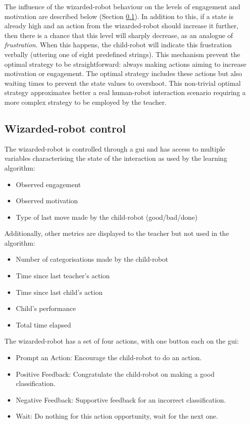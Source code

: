 The influence of the wizarded-robot behaviour on the levels of engagement and motivation are described below (Section \ref{ssec:woz_wizarded_robot}). In addition to this, if a state is already high and an action from the wizarded-robot should increase it further, then there is a chance that this level will sharply decrease, as an analogue of \textit{frustration}. When this happens, the child-robot will indicate this frustration verbally (uttering one of eight predefined strings). This mechanism prevent the optimal strategy to be straightforward: always making actions aiming to increase motivation or engagement. The optimal strategy includes these actions but also waiting times to prevent the state values to overshoot. This non-trivial optimal strategy approximates better a real human-robot interaction scenario requiring a more complex strategy to be employed by the teacher.

\subsection{Wizarded-robot control}
\label{ssec:woz_wizarded_robot}
The wizarded-robot is controlled through a \gls{gui} and has access to multiple variables characterising the state of the interaction as used by the learning algorithm:
\begin{itemize}
	\item Observed engagement
	\item Observed motivation
	\item Type of last move made by the child-robot (good/bad/done)
\end{itemize}
Additionally, other metrics are displayed to the teacher but not used in the algorithm:
\begin{itemize}
	\item Number of categorisations made by the child-robot
	\item Time since last teacher's action
	\item Time since last child's action
	\item Child's performance
	\item Total time elapsed
\end{itemize}


The wizarded-robot has a set of four actions, with one button each on the \gls{gui}: 
\begin{itemize}
	\item Prompt an Action: Encourage the child-robot to do an action.
	\item Positive Feedback: Congratulate the child-robot on making a good classification.
	\item Negative Feedback: Supportive feedback for an incorrect classification.
	\item Wait: Do nothing for this action opportunity, wait for the next one.
\end{itemize}

